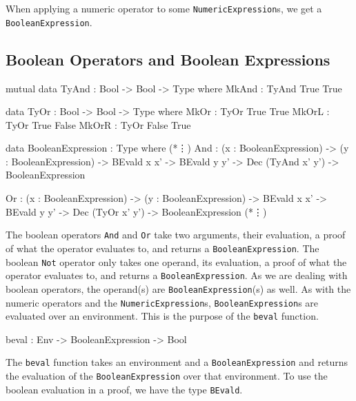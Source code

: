         When applying a numeric operator to some \texttt{NumericExpression}s, we get a \texttt{BooleanExpression}.
    
    \subsection{Boolean Operators and Boolean Expressions}
        \begin{code}[caption={The definitions of \texttt{And} and \texttt{Or}},escapeinside={(*}{*)}]
        mutual
            data TyAnd : Bool -> Bool -> Type where
                MkAnd  : TyAnd True True
                
            data TyOr : Bool -> Bool -> Type where
                MkOr  : TyOr True True
                MkOrL : TyOr True False
                MkOrR : TyOr False True
                
            data BooleanExpression : Type where
                (*\vdots*)
                And  : (x : BooleanExpression)
                    -> (y : BooleanExpression)
                    -> BEvald x x'
                    -> BEvald y y'
                    -> Dec (TyAnd x' y')
                    -> BooleanExpression
                    
                Or   : (x : BooleanExpression)
                    -> (y : BooleanExpression)
                    -> BEvald x x'
                    -> BEvald y y'
                    -> Dec (TyOr x' y')
                    -> BooleanExpression
                (*\vdots*)
        \end{code}
        The boolean operators \texttt{And} and \texttt{Or} take two arguments, their evaluation, a proof of what the operator evaluates to, and returns a \texttt{BooleanExpression}. The boolean \texttt{Not} operator only takes one operand, its evaluation, a proof of what the operator evaluates to, and returns a \texttt{BooleanExpression}. As we are dealing with boolean operators, the operand(s) are \texttt{BooleanExpression}(s) as well.
        As with the numeric operators and the \texttt{NumericExpression}s, \texttt{BooleanExpression}s are evaluated over an environment. This is the purpose of the \texttt{beval} function.
        \begin{code}[caption={The type of the \texttt{beval} function}]
            beval : Env -> BooleanExpression -> Bool
        \end{code}
        The \texttt{beval} function takes an environment and a \texttt{BooleanExpression} and returns the evaluation of the \texttt{BooleanExpression} over that environment. To use the boolean evaluation in a proof, we have the type \texttt{BEvald}.
